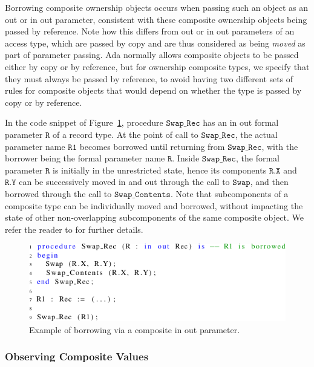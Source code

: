 \documentclass{llncs}
\newcommand\var[1]{\ensuremath{\mathtt{#1}}}
\newcommand{\keyword}[1]{\textsf{#1}}
\begin{document}
Borrowing composite ownership objects occurs when passing such an object as an \keyword{out} or \keyword{in out} parameter, consistent with
these composite ownership objects being passed by reference. Note how this differs from \keyword{out} or \keyword{in out} parameters of an access type, which are passed by copy
and are thus considered as being \textit{moved} as part of parameter passing. Ada normally allows composite objects to be passed either by copy or by reference, but for ownership composite types, we specify that they must always be passed by reference, to avoid having two different sets of rules for composite objects that would depend on whether the type is passed by copy or by reference.

In the code snippet of Figure~\ref{fig:borrowingComposite}, procedure \var{Swap\_Rec} has an \keyword{in out} formal parameter \var{R} of a record type. At the point of
call to \var{Swap\_Rec}, the actual parameter name \var{R1} becomes borrowed until returning from \var{Swap\_Rec}, with the borrower being the formal parameter name \var{R}.  Inside \var{Swap\_Rec}, the formal parameter \var{R} is initially
in the unrestricted state, hence its components \var{R.X} and \var{R.Y} can be successively moved in and out through the call to \var{Swap}, and then borrowed through the call to \var{Swap\_Contents}.
Note that subcomponents of a composite type can be individually moved and borrowed, without impacting the state of other non-overlapping subcomponents of the same composite object.
We refer the reader to \cite{AI2018} for further details.

\begin{figure}[htb!]
\centering
   \includegraphics[]{borrowingComposite}
   \caption{Example of borrowing via a composite \keyword{in out} parameter.}
   \label{fig:borrowingComposite}
\end{figure}


\subsubsection{Observing Composite Values}
\label{subsubsec:extendingBorrowing}
\end{document}
